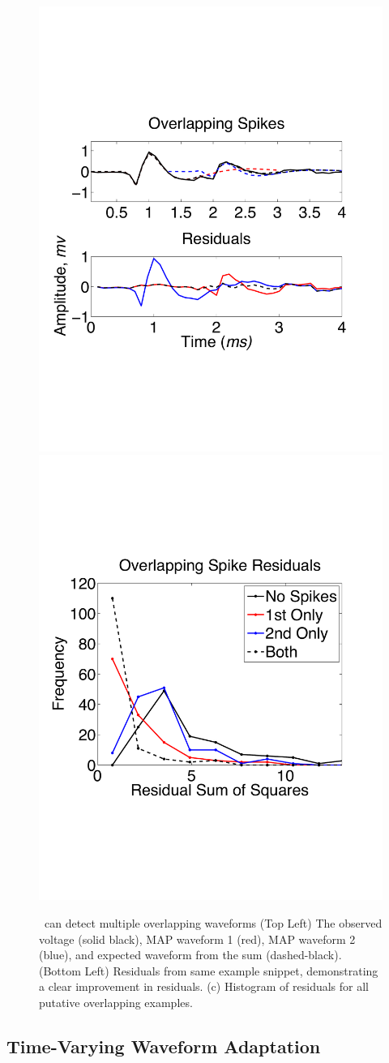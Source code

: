 \begin{center}
\begin{figure}
\includegraphics[width=.28\textwidth]{../figs/alloverlappingspikes/olspike3}
\includegraphics[width=.28\textwidth]{../figs/overlappingstatv2.pdf}
\caption{\smug\ can detect multiple overlapping waveforms (Top Left) The observed voltage (solid black), MAP waveform 1 (red), MAP waveform 2 (blue), and expected waveform from the sum (dashed-black). (Bottom Left) Residuals from same example snippet, demonstrating a clear improvement in residuals.  (c) {Histogram of residuals for all putative overlapping examples.}} \label{fig:overlapping}
\end{figure}
\end{center}


\vspace{-10pt}
\subsection{Time-Varying Waveform Adaptation} \label{sub:adapt}


